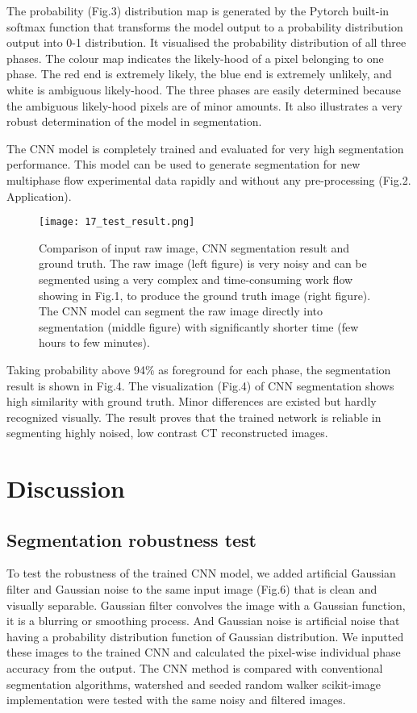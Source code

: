 \documentclass[draft,linenumbers]{agujournal2018}
\begin{document}
The probability (Fig.3) distribution map is generated by the Pytorch built-in softmax function that transforms the model output to a probability distribution output into 0-1 distribution. It visualised the probability distribution of all three phases. The colour map indicates the likely-hood of a pixel belonging to one phase. The red end is extremely likely, the blue end is extremely unlikely, and white is ambiguous likely-hood. The three phases are easily determined because the ambiguous likely-hood pixels are of minor amounts. It also illustrates a very robust determination of the model in segmentation. 

The CNN model is completely trained and evaluated for very high segmentation performance. This model can be used to generate segmentation for new multiphase flow experimental data rapidly and without any pre-processing (Fig.2. Application).

\begin{figure}[h]
 \centering
 \texttt{[image: 17\_test\_result.png]}
 \caption{Comparison of input raw image, CNN segmentation result and ground truth. The raw image (left figure) is very noisy and can be segmented using a very complex and time-consuming work flow showing in Fig.1, to produce the ground truth image (right figure). The CNN model can segment the raw image directly into segmentation (middle figure) with significantly shorter time (few hours to few minutes).}
 \label{fig4}
 \end{figure}

Taking probability above 94\% as foreground for each phase, the segmentation result is shown in Fig.4. The visualization (Fig.4) of CNN segmentation shows high similarity with ground truth. Minor differences are existed but hardly recognized visually. The result proves that the trained network is reliable in segmenting highly noised, low contrast CT reconstructed images.

\section{Discussion}
\subsection{Segmentation robustness test}
To test the robustness of the trained CNN model, we added artificial Gaussian filter and Gaussian noise to the same input image (Fig.6) that is clean and visually separable. Gaussian filter convolves the image with a Gaussian function, it is a blurring or smoothing process. And Gaussian noise is artificial noise that having a probability distribution function of Gaussian distribution. We inputted these images to the trained CNN and calculated the pixel-wise individual phase accuracy from the output. The CNN method is compared with conventional segmentation algorithms, watershed \citet{neubert2014compact} and seeded random walker \citet{grady2006random} scikit-image implementation were tested with the same noisy and filtered images.
\end{document}
